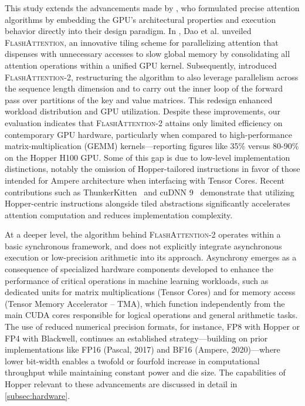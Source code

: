 This study extends the advancements made by \citet{dao2022flashattention}, who formulated precise attention algorithms by embedding the GPU's architectural properties and execution behavior directly into their design paradigm. In \citep{dao2022flashattention}, Dao et al. unveiled \textsc{FlashAttention}, an innovative tiling scheme for parallelizing attention that dispenses with unnecessary accesses to slow global memory by consolidating all attention operations within a unified GPU kernel. Subsequently, \citet{dao2023flashattention2} introduced \textsc{FlashAttention-2}, restructuring the algorithm to also leverage parallelism across the sequence length dimension and to carry out the inner loop of the forward pass over partitions of the key and value matrices. This redesign enhanced workload distribution and GPU utilization. Despite these improvements, our evaluation indicates that \textsc{FlashAttention-2} attains only limited efficiency on contemporary GPU hardware, particularly when compared to high-performance matrix-multiplication (GEMM) kernels—reporting figures like 35\% versus 80-90\% on the Hopper H100 GPU. Some of this gap is due to low-level implementation distinctions, notably the omission of Hopper-tailored instructions in favor of those intended for Ampere architecture when interfacing with Tensor Cores. Recent contributions such as ThunkerKitten~\citep{spector2024thunder} and cuDNN 9~\citep{cudnn9} demonstrate that utilizing Hopper-centric instructions alongside tiled abstractions significantly accelerates attention computation and reduces implementation complexity.

At a deeper level, the algorithm behind \textsc{FlashAttention-2} operates within a basic synchronous framework, and does not explicitly integrate asynchronous execution or low-precision arithmetic into its approach. Asynchrony emerges as a consequence of specialized hardware components developed to enhance the performance of critical operations in machine learning workloads, such as dedicated units for matrix multiplications (Tensor Cores) and for memory access (Tensor Memory Accelerator -- TMA), which function independently from the main CUDA cores responsible for logical operations and general arithmetic tasks. The use of reduced numerical precision formats, for instance, FP8 with Hopper or FP4 with Blackwell, continues an established strategy—building on prior implementations like FP16 (Pascal, 2017) and BF16 (Ampere, 2020)—where lower bit-width enables a twofold or fourfold increase in computational throughput while maintaining constant power and die size. The capabilities of Hopper relevant to these advancements are discussed in detail in \cref{subsec:hardware}.

